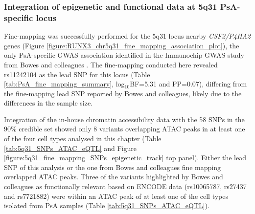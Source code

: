 \subsubsection{Integration of epigenetic and functional data at 5q31 PsA-specific locus}
Fine-mapping was successfully performed for the 5q31 locus nearby \textit{CSF2/P4HA2} genes (Figure \ref{figure:RUNX3_chr5q31_fine_mapping_association_plot}), the only PsA-specific GWAS association identified in the Immunochip GWAS study from Bowes and colleagues \parencite{Bowes2015}. The fine-mapping conducted here revealed rs11242104 as the lead SNP for this locus (Table \ref{tab:PsA_fine_mapping_summary}, log$_{10}$BF=5.31 and PP=0.07), differing from the fine-mapping lead SNP reported by Bowes and colleagues, likely due to the differences in the sample size.



Integration of the in-house chromatin accessibility data with the 58 SNPs in the 90\% credible set showed only 8 variants overlapping ATAC peaks in at least one of the four cell types analysed in this chapter (Table \ref{tab:5q31_SNPs_ATAC_eQTL} and Figure \ref{figure:5q31_fine_mapping_SNPs_epigenetic_track} top panel). Either the lead SNP of this analysis or the one from Bowes and colleagues fine mapping overlapped ATAC peaks. Three of the variants highlighted by Bowes and colleagues as functionally relevant based on ENCODE data (rs10065787, rs27437 and rs7721882) were within an ATAC peak of at least one of the cell types isolated from PsA samples (Table \ref{tab:5q31_SNPs_ATAC_eQTL}). 


